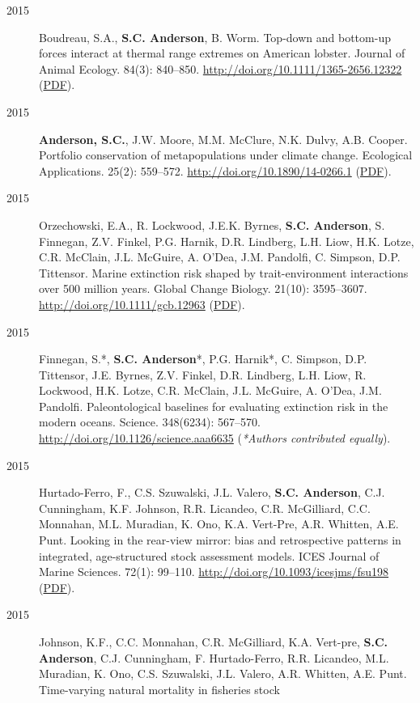 \begin{description}
\item[2015]
Boudreau, S.A., \textbf{S.C. Anderson}, B. Worm. Top-down and bottom-up
forces interact at thermal range extremes on American lobster. Journal
of Animal Ecology. 84(3): 840--850.
\url{http://doi.org/10.1111/1365-2656.12322}
(\href{https://dl.dropboxusercontent.com/u/254940/papers/Boudreau_etal_2015_lobster.pdf}{PDF}).
\item[2015]
\textbf{Anderson, S.C.}, J.W. Moore, M.M. McClure, N.K. Dulvy, A.B.
Cooper. Portfolio conservation of metapopulations under climate change.
Ecological Applications. 25(2): 559--572.
\url{http://doi.org/10.1890/14-0266.1}
(\href{https://dl.dropboxusercontent.com/u/254940/papers/Anderson_etal_2015_salmonportfolios.pdf}{PDF}).
\item[2015]
Orzechowski, E.A., R. Lockwood, J.E.K. Byrnes, \textbf{S.C. Anderson},
S. Finnegan, Z.V. Finkel, P.G. Harnik, D.R. Lindberg, L.H. Liow, H.K.
Lotze, C.R. McClain, J.L. McGuire, A. O'Dea, J.M. Pandolfi, C. Simpson,
D.P. Tittensor. Marine extinction risk shaped by trait-environment
interactions over 500 million years. Global Change Biology. 21(10):
3595--3607. \url{http://doi.org/10.1111/gcb.12963}
(\href{https://dl.dropboxusercontent.com/u/254940/papers/Orzechowski_etal_2015_paleometa.pdf}{PDF}).
\item[2015]
Finnegan, S.*, \textbf{S.C. Anderson}*, P.G. Harnik*, C. Simpson, D.P.
Tittensor, J.E. Byrnes, Z.V. Finkel, D.R. Lindberg, L.H. Liow, R.
Lockwood, H.K. Lotze, C.R. McClain, J.L. McGuire, A. O'Dea, J.M.
Pandolfi. Paleontological baselines for evaluating extinction risk in
the modern oceans. Science. 348(6234): 567--570.
\url{http://doi.org/10.1126/science.aaa6635} (\emph{*Authors contributed
equally}).
\item[2015]
Hurtado-Ferro, F., C.S. Szuwalski, J.L. Valero, \textbf{S.C. Anderson},
C.J. Cunningham, K.F. Johnson, R.R. Licandeo, C.R. McGilliard, C.C.
Monnahan, M.L. Muradian, K. Ono, K.A. Vert-Pre, A.R. Whitten, A.E. Punt.
Looking in the rear-view mirror: bias and retrospective patterns in
integrated, age-structured stock assessment models. ICES Journal of
Marine Sciences. 72(1): 99--110.
\url{http://doi.org/10.1093/icesjms/fsu198}
(\href{https://dl.dropboxusercontent.com/u/254940/papers/Hurtado-Ferro_etal_2014_retrospective.pdf}{PDF}).
\item[2015]
Johnson, K.F., C.C. Monnahan, C.R. McGilliard, K.A. Vert-pre,
\textbf{S.C. Anderson}, C.J. Cunningham, F. Hurtado-Ferro, R.R.
Licandeo, M.L. Muradian, K. Ono, C.S. Szuwalski, J.L. Valero, A.R.
Whitten, A.E. Punt. Time-varying natural mortality in fisheries stock

\end{description}

